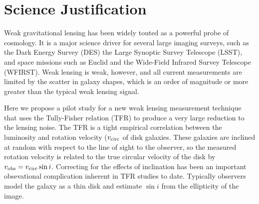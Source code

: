 \documentclass[12pt]{article}
\begin{document}
\section{Science Justification}
 Weak gravitational lensing has been widely touted as a powerful probe of cosmology. It is a major science driver for several large imaging surveys, such as the Dark Energy Survey (DES) the Large Synoptic Survey Telescope (LSST), and space missions such as Euclid and the Wide-Field Infrared Survey Telescope (WFIRST). Weak lensing is weak, however, and all current measurements are limited by the scatter in galaxy shapes, which is an order of magnitude or more greater than the typical weak lensing signal. 

Here we propose a pilot study for a new weak lensing measurement technique that uses the Tully-Fisher relation (TFR) to produce a very large reduction to the lensing noise. The TFR is a tight empirical correlation between the luminosity and rotation velocity ($v_{\rm circ}$ of disk galaxies. These galaxies are inclined at random with respect to the line of sight to the observer, so the measured rotation velocity is related to the true circular velocity of the disk by $v_{\rm obs} = v_{\rm circ} \sin i$. Correcting for the effects of inclination has been an important obsevational complication inherent in TFR studies to date. Typically observers model the galaxy as a thin disk and estimate $\sin i$ from the ellipticity of the image.
\end{document}
